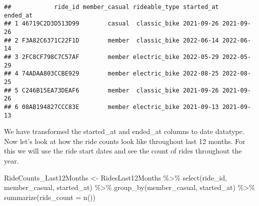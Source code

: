 \documentclass[
]{article}
\newenvironment{Shaded}{\begin{snugshade}}{\end{snugshade}}
\newcommand{\AttributeTok}[1]{\textcolor[rgb]{0.77,0.63,0.00}{#1}}
\newcommand{\DecValTok}[1]{\textcolor[rgb]{0.00,0.00,0.81}{#1}}
\newcommand{\FunctionTok}[1]{\textcolor[rgb]{0.00,0.00,0.00}{#1}}
\newcommand{\NormalTok}[1]{#1}
\newcommand{\OtherTok}[1]{\textcolor[rgb]{0.56,0.35,0.01}{#1}}
\newcommand{\SpecialCharTok}[1]{\textcolor[rgb]{0.00,0.00,0.00}{#1}}
\begin{document}
\begin{Shaded}
\end{Shaded}

\begin{verbatim}
##            ride_id member_casual rideable_type started_at   ended_at
## 1 46719C2D3D513D99        casual  classic_bike 2021-09-26 2021-09-26
## 2 F3A82C6371C22F1D        member  classic_bike 2022-06-14 2022-06-14
## 3 2FC8CF798C7C57AF        member electric_bike 2022-05-29 2022-05-29
## 4 74ADAA803CCBE929        member electric_bike 2022-08-25 2022-08-25
## 5 C246B15EA73DEAF6        member  classic_bike 2021-09-26 2021-09-26
## 6 08AB194827CCC83E        member electric_bike 2021-09-13 2021-09-13
\end{verbatim}

We have transformed the started\_at and ended\_at columns to date
datatype. Now let's look at how the ride counts look like throughout
last 12 months. For this we will use the ride start dates and see the
count of rides throughout the year.

\begin{Shaded}
\begin{Highlighting}[]
\NormalTok{RideCounts\_Last12Months }\OtherTok{\textless{}{-}}\NormalTok{ RidesLast12Months }\SpecialCharTok{\%\textgreater{}\%}
  \FunctionTok{select}\NormalTok{(ride\_id, member\_casual, started\_at) }\SpecialCharTok{\%\textgreater{}\%}
  \FunctionTok{group\_by}\NormalTok{(member\_casual, started\_at) }\SpecialCharTok{\%\textgreater{}\%}
  \FunctionTok{summarize}\NormalTok{(}\AttributeTok{ride\_count =} \FunctionTok{n}\NormalTok{())}
\end{Highlighting}
\end{Shaded}
\end{document}
